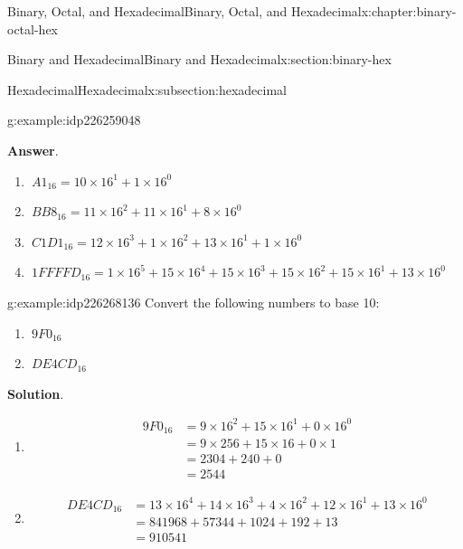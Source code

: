 \documentclass[twoside,10pt,]{book}
\newcommand{\blocktitlefont}{\relax}
\numberwithin{equation}{section}
\newcommand{\amp}{&}
\begin{document}
\begin{chapterptx}{Binary, Octal, and Hexadecimal}{}{Binary, Octal, and Hexadecimal}{}{}{x:chapter:binary-octal-hex}
\begin{sectionptx}{Binary and Hexadecimal}{}{Binary and Hexadecimal}{}{}{x:section:binary-hex}
\begin{subsectionptx}{Hexadecimal}{}{Hexadecimal}{}{}{x:subsection:hexadecimal}
\begin{example}{}{g:example:idp226259048}
\begin{enumerate}
\end{enumerate}
\par\smallskip%
\noindent\textbf{\blocktitlefont Answer}.\label{g:answer:idp226255720}{}\hypertarget{g:answer:idp226255720}{}\quad{}%
\begin{enumerate}
\item{}\(\displaystyle \ A1_{16}=10\times16^1+1\times16^0\)%
\item{}\(\displaystyle \ BB8_{16}=11\times16^2+11\times16^1+8\times16^0\)%
\item{}\(\displaystyle \ C1D1_{16}=12\times16^3+1\times16^2+13\times16^1+1\times16^0\)%
\item{}\(\displaystyle \ 1FFFFD_{16}=1\times16^5+15\times16^4+15\times16^3+15\times16^2+15\times16^1+13\times16^0\)%
\end{enumerate}
\end{example}
\begin{example}{}{g:example:idp226268136}%
Convert the following numbers to base 10: %
\begin{enumerate}
\item{}\(\displaystyle \ 9F0_{16}\)%
\item{}\(\displaystyle \ DE4CD_{16}\)%
\end{enumerate}
\par\smallskip%
\noindent\textbf{\blocktitlefont Solution}.\label{g:solution:idp226264680}{}\hypertarget{g:solution:idp226264680}{}\quad{}%
\begin{enumerate}
\item{}%
\begin{align*}
\ 9F0_{16} \amp = 9\times16^2+15\times16^1+0\times16^0\\
\amp = 9\times256+15\times16+0\times1\\
\amp= 2304+240+0\\
\amp = 2544
\end{align*}
%
\item{}%
\begin{align*}
\ DE4CD_{16} \amp = 13\times16^4+14\times16^3+4\times16^2+12\times16^1+13\times16^0\\
\amp = 841968+57344+1024+192+13\\
\amp = 910541
\end{align*}
%
\end{enumerate}
\end{example}
\end{subsectionptx}
%
%
\typeout{************************************************}
\typeout{************************************************}

\end{sectionptx}
\end{chapterptx}
\end{document}
